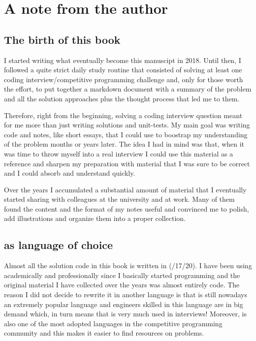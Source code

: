\chapter*{A note from the author}

\section*{The birth of this book}
I started writing what eventually become this manuscipt in 2018. 
Until then, I followed a quite strict daily study routine that consisted of solving at least one coding interview/competitive programming challenge and, only for those worth the effort, to put together a markdown document with a summary of the problem and all the solution approaches plus the thought process that led me to them.

Therefore, right from the beginning, solving a coding interview question meant for me more than just writing solutions and unit-tests.
My main goal was writing code and notes, like short essays, that I could use to boostrap my understanding of the problem months or years later.
The idea I had in mind was that, when it was time to throw myself into a real interview I could use this material as a reference and sharpen my preparation with material 
that I was sure to be correct and I could absorb and understand quickly.

Over the years I accumulated a substantial amount of material that I eventually started sharing with colleagues at the university and at work. 
Many of them found the content and the format of my notes useful and convinced me to polish, add illustrations and organize them into a proper collection.

\section*{\protect \CC as language of choice}
Almost all the solution code in this book is written in \CC (/17/20). 
I have been using \CC academically and professionally since I basically started programming and the original material I have collected over the years was almost entirely \CC code. 
The reason I did not decide to rewrite it in another language is that \CC is still nowadays an extremely popular language and engineers skilled in this language are in big demand which, in turn means that \CC is very much used in interviews!
Moreover, \CC is also one of the most adopted languages in the competitive programming community and this makes it easier to find resources on problems.


